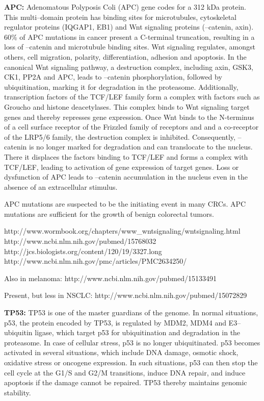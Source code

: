       \textbf{APC:} Adenomatous Polyposis Coli (APC) gene codes for a 312 kDa
      protein. This multi--domain protein has binding sites for microtubules,
      cytoskeletal regulator proteins (IQGAP1, EB1) and Wnt signaling proteins
      (\beta--catenin, axin). 60\% of APC mutations in cancer present a
      C-terminal truncation, resulting in a loss of \beta--catenin and
      microtubule binding sites. Wnt signaling regulates, amongst others, cell
      migration, polarity, differentiation, adhesion and apoptosis. In the
      canonical Wnt signaling pathway, a destruction complex, including axin,
      GSK3, CK1\alpha, PP2A and APC, leads to \beta--catenin phosphorylation,
      followed by ubiquitination, marking it for degradation in the proteasome.
      Additionally, transcription factors of the TCF/LEF family form a complex
      with factors such as Groucho and histone deacetylases. This complex binds
      to Wnt signaling target genes and thereby represses gene expression. Once
      Wnt binds to the N-terminus of a cell surface receptor of the Frizzled
      family of receptors and and a co-receptor of the LRP5/6 family, the
      destruction complex is inhibited. Consequently, \beta--catenin is no
      longer marked for degradation and can translocate to the nucleus. There it
      displaces the factors binding to TCF/LEF and forms a complex with TCF/LEF,
      leading to activation of gene expression of target genes. Loss or
      dysfunction of APC leads to \beta--catenin accumulation in the nucleus
      even in the absence of  an extracellular stimulus.

      APC mutations are suspected to be the initiating event in many CRCs. APC
      mutations are sufficient for the growth of benign colorectal tumors.

      http://www.wormbook.org/chapters/www_wntsignaling/wntsignaling.html
      http://www.ncbi.nlm.nih.gov/pubmed/15768032
      http://jcs.biologists.org/content/120/19/3327.long
      http://www.ncbi.nlm.nih.gov/pmc/articles/PMC2634250/

      Also in melanoma: http://www.ncbi.nlm.nih.gov/pubmed/15133491

      Present, but less in NSCLC: http://www.ncbi.nlm.nih.gov/pubmed/15072829

      \textbf{TP53:} TP53 is one of the master guardians of the genome. In
      normal situations, p53, the protein encoded by TP53, is regulated by MDM2,
      MDM4 and E3--ubiquitin ligase, which target p53 for ubiquitination and
      degradation in the proteasome. In case of cellular stress, p53 is no
      longer ubiquitinated. p53 becomes activated in several situations, which
      include  DNA damage, osmotic shock, oxidative stress or oncogene
      expression. In such situations, p53 can then stop the cell cycle at the
      G1/S and G2/M transitions, induce DNA repair, and induce apoptosis if the
      damage cannot be repaired. TP53 thereby maintains genomic stability.

